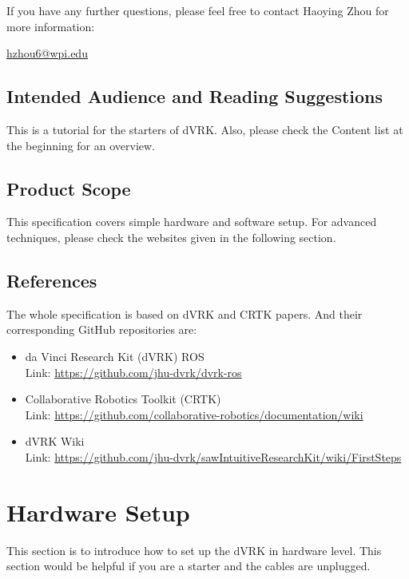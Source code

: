 If you have any further questions, please feel free to contact Haoying Zhou for more information: 

\href{mailto:hzhou6@wpi.edu}{hzhou6@wpi.edu}

\section{Intended Audience and Reading Suggestions}

This is a tutorial for the starters of dVRK. Also, please check the Content list at the beginning for an overview.

\section{Product Scope}

This specification covers simple hardware and software setup. For advanced techniques, please check the websites given in the following section.

\section{References}

The whole specification is based on dVRK\cite{kazanzides2014open} and CRTK\cite{su2020collaborative} papers. And their corresponding GitHub repositories are:

\begin{itemize}
    \item da Vinci Research Kit (dVRK) ROS \\ Link: \url{https://github.com/jhu-dvrk/dvrk-ros}
    \item Collaborative Robotics Toolkit (CRTK) \\ Link: \url{https://github.com/collaborative-robotics/documentation/wiki}
    \item dVRK Wiki \\ Link: \url{https://github.com/jhu-dvrk/sawIntuitiveResearchKit/wiki/FirstSteps}
\end{itemize}


\chapter{Hardware Setup}
\label{ch: hardware}

This section is to introduce how to set up the dVRK in hardware level. This section would be helpful if you are a starter and the cables are unplugged. 

